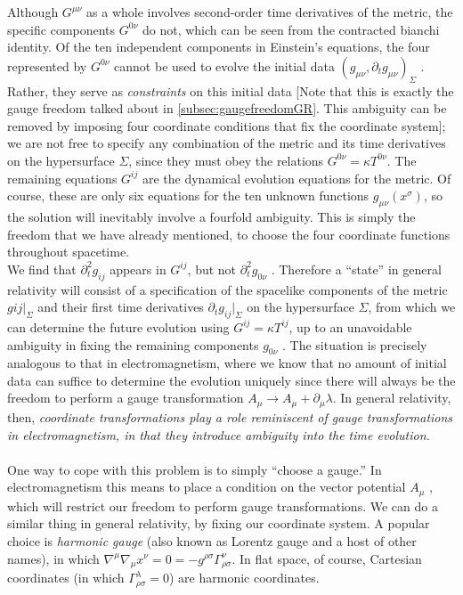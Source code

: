  Although $G^{μν}$ as a whole involves
 second-order time derivatives of the metric, the specific components $G^{0ν}$ do not, which can be seen from the contracted bianchi identity. Of the ten
 independent components in Einstein’s equations, the four represented by $G^{0 \nu}$ cannot be used to evolve the initial data $(g_{μν} , ∂_t g_{μν} )_Σ$ . Rather, they serve as \emph{constraints}
 on this initial data [Note that this is exactly the gauge freedom talked about in \ref{subsec:gaugefreedomGR}. This ambiguity can be removed by imposing four coordinate conditions that fix the coordinate system]; we are not free to specify any combination of the metric and its time
 derivatives on the hypersurface $Σ$, since they must obey the relations $G^{0 \nu} = \kappa T^{0 \nu}$. The remaining equations $G^{ij}$ are the dynamical evolution equations for the metric. Of course, these are only six equations
 for the ten unknown functions $g_{μν} (x^σ )$, so the solution will inevitably involve a fourfold
 ambiguity. This is simply the freedom that we have already mentioned, to choose the four
 coordinate functions throughout spacetime.\\
 We find that $∂^2_t g_{ ij}$ appears in
 $G^{ij}$, but not $∂^2_t g_{0ν}$ . Therefore a “state” in general relativity will consist of a specification of the spacelike components of the metric $g ij |_Σ$ and their first time derivatives $∂_t g_{ij} |_\Sigma$ on the
 hypersurface $Σ$, from which we can determine the future evolution using $G^{ij} = \kappa T^{ij}$, up to an
 unavoidable ambiguity in fixing the remaining components $g_{0ν}$ . The situation is precisely
 analogous to that in electromagnetism, where we know that no amount of initial data can
 suffice to determine the evolution uniquely since there will always be the freedom to perform a
 gauge transformation $A_μ → A_μ +∂_μ λ$. In general relativity, then, \emph{coordinate transformations
 	play a role reminiscent of gauge transformations in electromagnetism, in that they introduce
 	ambiguity into the time evolution.}
 \\
 \\
 One way to cope with this problem is to simply “choose a gauge.” In electromagnetism
 this means to place a condition on the vector potential $A_μ$ , which will restrict our freedom
 to perform gauge transformations. We can do a similar thing in general
 relativity, by fixing our coordinate system. A popular choice is \emph{harmonic gauge} (also
 known as Lorentz gauge and a host of other names), in which $\nabla^\mu \nabla_\mu x^\nu =0=-g^{\rho \sigma} \Gamma^\nu_{\rho \sigma}$. In flat space, of course, Cartesian coordinates (in which $Γ^λ_{ρσ} = 0$) are harmonic coordinates.

